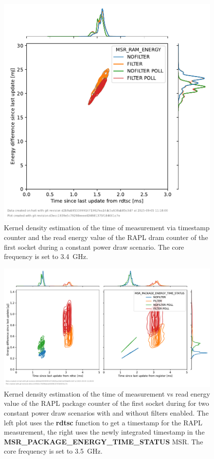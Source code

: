 \begin{figure}[]
    \centering
    \includegraphics[width=0.54\columnwidth]{fig/rapl-update-intervals/MSR_RAM_ENERGY_3400000.pdf}
    \caption{Kernel density estimation of the time of measurement via timestamp counter and the read energy value of the RAPL dram counter of the first socket during a constant power draw scenario.
    The core frequency is set to \SI{3.4}{\GHz}.}
\end{figure}

\clearpage
\begin{figure}[]
    \centering
    \includegraphics[width=\columnwidth]{fig/rapl-update-intervals/MSR_PACKAGE_ENERGY_TIME_STATUS_3500000.pdf}
    \caption{Kernel density estimation of the time of measurement vs read energy value of the RAPL package counter of the first socket during for two constant power draw scenarios with and without filters enabled.
    The left plot uses the \textbf{rdtsc} function to get a timestamp for the RAPL measurement, the right uses the newly integrated timestamp in the \textbf{MSR\_PACKAGE\_ENERGY\_TIME\_STATUS} MSR.
    The core frequency is set to \SI{3.5}{\GHz}.}
\end{figure}

